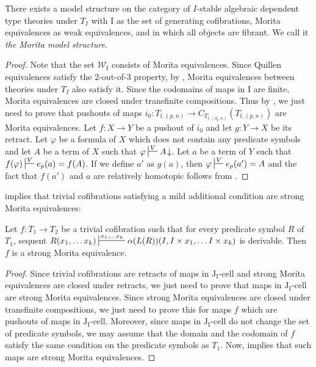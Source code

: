 \documentclass[reqno]{amsart}
\theoremstyle{definition}
\theoremstyle{remark}
\newcommand{\we}{\mathcal{W}}
\newcommand{\I}{\mathrm{I}}
\newcommand{\J}{\mathrm{J}}
\newcommand{\class}[2]{#1\text{-}\mathrm{#2}}
\newcommand{\Icell}[1][\I]{\class{#1}{cell}}
\newcommand{\Jcell}[1][]{\Icell[\J#1]}
\newcommand{\cyli}{i}
\numberwithin{figure}{section}
\begin{document}
\begin{thm}
There exists a model structure on the category of $I$-stable algebraic dependent type theories under $T_I$
with $\I$ as the set of generating cofibrations, Morita equivalences as weak equivalences, and in which all objects are fibrant.
We call it \emph{the Morita model structure}.
\end{thm}
\begin{proof}
Note that the set $\we_\I$ consists of Morita equivalences.
Since Quillen equivalences satisfy the 2-out-of-3 property, by , Morita equivalences between theories under $T_I$ also satisfy it.
Since the codomains of maps in $\I$ are finite, Morita equivalences are closed under transfinite compositions.
Thus by , we just need to prove that pushouts of maps $\cyli_0 : T_{l,(p,n)} \to C_{T_{l,(d_p,n)}}(T_{l,(p,n)})$ are Morita equivalences.
Let $f : X \to Y$ be a pushout of $\cyli_0$ and let $g : Y \to X$ be its retract.
Let $\varphi$ be a formula of $X$ which does not contain any predicate symbols and let $A$ be a term of $X$ such that $\varphi \sststile{}{V} A\!\downarrow$.
Let $a$ be a term of $Y$ such that $f(\varphi) \sststile{}{V} e_p(a) = f(A)$.
If we define $a'$ as $g(a)$, then $\varphi \sststile{}{V} e_p(a') = A$ and the fact that $f(a')$ and $a$ are relatively homotopic follows from .
\end{proof}

 implies that trivial cofibrations satisfying a mild additional condition are strong Morita equivalences:

\begin{prop}
Let $f : T_1 \to T_2$ be a trivial cofibration such that for every predicate symbol $R$ of $T_1$,
sequent $R(x_1, \ldots x_k) \sststile{}{x_1, \ldots x_k} \alpha(L(R))(I, I \times x_1, \ldots I \times x_k)$ is derivable.
Then $f$ is a strong Morita equivalence.
\end{prop}
\begin{proof}
Since trivial cofibrations are retracts of maps in $\Jcell[_\I]$ and strong Morita equivalences are closed under retracts,
we just need to prove that maps in $\Jcell[_\I]$ are strong Morita equivalences.
Since strong Morita equivalences are closed under transfinite compositions, we just need to prove this for maps $f$ which are pushouts of maps in $\Jcell[_\I]$.
Moreover, since maps in $\Jcell[_\I]$ do not change the set of predicate symbols,
we may assume that the domain and the codomain of $f$ satisfy the same condition on the predicate symbols as $T_1$.
Now,  implies that such maps are strong Morita equivalences.
\end{proof}
\end{document}
